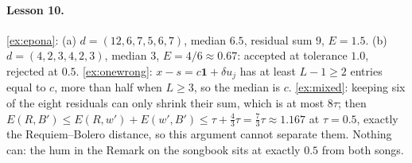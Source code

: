 \documentclass[11pt]{article}
\theoremstyle{definition}
\newcommand{\one}{\mathbf{1}}
\begin{document}
\paragraph{Lesson 10.} \ref{ex:epona}: (a) $d=(12,6,7,5,6,7)$, median $6.5$, residual
sum $9$, $E=1.5$. (b) $d=(4,2,3,4,2,3)$, median 3, $E=4/6\approx0.67$: accepted at
tolerance $1.0$, rejected at $0.5$. \ref{ex:onewrong}: $x-s=c\one+\delta u_j$ has at
least $L-1\ge2$ entries equal to $c$, more than half when $L\ge3$, so the median is
$c$. \ref{ex:mixed}: keeping six of the eight residuals can only shrink their sum,
which is at most $8\tau$; then
$E(R,B')\le E(R,w')+E(w',B')\le\tau+\frac43\tau=\frac73\tau\approx1.167$ at
$\tau=0.5$, exactly the Requiem--Bolero distance, so this argument cannot separate
them. Nothing can: the hum in the Remark on the songbook sits at exactly $0.5$ from
both songs.
\end{document}
